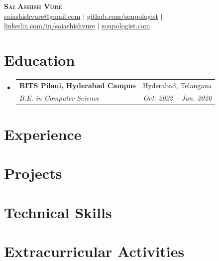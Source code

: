 \documentclass[letterpaper,11pt]{article}
\makeatletter
\newcommand{\resumeItem}[1]{
  \item\small{
    {#1 \vspace{-2pt}}
  }
}
\newcommand{\resumeSubheading}[4]{
  \vspace{-2pt}\item
    \begin{tabular*}{0.97\textwidth}[t]{l@{\extracolsep{\fill}}r}
      \textbf{#1} & #2 \\
      \textit{\small#3} & \textit{\small #4} \\
    \end{tabular*}\vspace{-7pt}
}
\newcommand{\resumeProjectHeading}[2]{
    \item
    \begin{tabular*}{0.97\textwidth}{l@{\extracolsep{\fill}}r}
      \small#1 & #2 \\
    \end{tabular*}\vspace{-7pt}
}
\newcommand{\resumeSubHeadingListStart}{\begin{itemize}[leftmargin=0.15in, label={}]}
\newcommand{\resumeSubHeadingListEnd}{\end{itemize}}
\newcommand{\resumeItemListStart}{\begin{itemize}}
\newcommand{\resumeItemListEnd}{\end{itemize}\vspace{-5pt}}
\makeatother
\begin{document}
\begin{center}
    \textbf{\Huge \scshape Sai Ashish Vure} \\ \vspace{3pt}
    \href{mailto:saiashishvure@gmail.com}{saiashishvure@gmail.com}
    $|$
    \href{https://github.com/soupologist}{github.com/soupologist}
    $|$
    \href{https://linkedin.com/in/saiashishvure}{linkedin.com/in/saiashishvure}
    $|$
    \href{https://soupologist.com}{soupologist.com}
\end{center}


\section{Education}
  \resumeSubHeadingListStart
    \resumeSubheading
      {BITS Pilani, Hyderabad Campus}{Hyderabad, Telangana}
      {B.E. in Computer Science}{Oct. 2022 -- Jun. 2026}
  \resumeSubHeadingListEnd


\section{Experience}
  \resumeSubHeadingListStart
  \resumeSubHeadingListEnd


\section{Projects}
  \resumeSubHeadingListStart
  \resumeSubHeadingListEnd


\section{Technical Skills}
  \begin{itemize}[leftmargin=0.15in, label={}]
    \small{\item{
    }}
  \end{itemize}


\section{Extracurricular Activities}
  \resumeSubHeadingListStart
  \resumeSubHeadingListEnd

\end{document}
